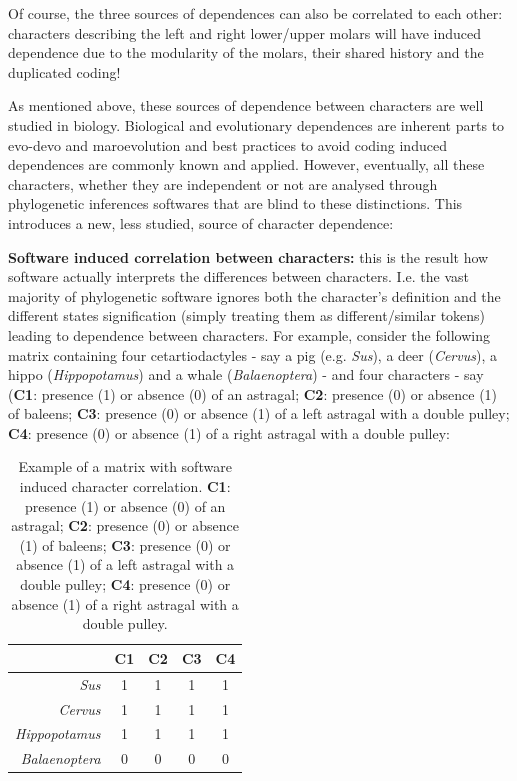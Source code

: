 \documentclass[12pt,letterpaper]{article}
\begin{document}
\noindent Of course, the three sources of dependences can also be correlated to each other: characters describing the left and right lower/upper molars will have induced dependence due to the modularity of the molars, their shared history and the duplicated coding!

As mentioned above, these sources of dependence between characters are well studied in biology.
Biological and evolutionary dependences are inherent parts to evo-devo and maroevolution and best practices to avoid coding induced dependences are commonly known and applied.
However, eventually, all these characters, whether they are independent or not are analysed through phylogenetic inferences softwares that are blind to these distinctions.
This introduces a new, less studied, source of character dependence:

\noindent \textbf{Software induced correlation between characters:} this is the result how software actually interprets the differences between characters.
I.e. the vast majority of phylogenetic software ignores both the character's definition and the different states signification (simply treating them as different/similar tokens) leading to dependence between characters.
For example, consider the following matrix containing four cetartiodactyles - say a pig (e.g. \textit{Sus}), a deer (\textit{Cervus}), a hippo (\textit{Hippopotamus}) and a whale (\textit{Balaenoptera}) - and four characters - say (\textbf{C1}: presence (1) or absence (0) of an astragal; \textbf{C2}: presence (0) or absence (1) of baleens; \textbf{C3}: presence (0) or absence (1) of a left astragal with a double pulley; \textbf{C4}: presence (0) or absence (1) of a right astragal with a double pulley:

\begin{table}
\center
    \begin{tabular}{r|cccc}
            & C1 & C2 & C3 & C4\\
        \hline
        \textit{Sus} & 1 & 1 & 1 & 1\\
        \textit{Cervus} & 1 & 1 & 1 & 1\\
        \textit{Hippopotamus} & 1 & 1 & 1 & 1\\
        \textit{Balaenoptera} & 0 & 0 & 0 & 0\\
    \end{tabular}
    \caption{Example of a matrix with software induced character correlation. \textbf{C1}: presence (1) or absence (0) of an astragal; \textbf{C2}: presence (0) or absence (1) of baleens; \textbf{C3}: presence (0) or absence (1) of a left astragal with a double pulley; \textbf{C4}: presence (0) or absence (1) of a right astragal with a double pulley.}
    \label{Tab:example_matrix}
\end{table}
\end{document}
